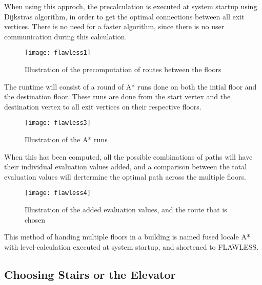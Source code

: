 When using this approch, the precalculation is executed at system startup using Dijkstras algorithm, in order to get the optimal connections between all exit vertices. There is no need for a faster algorithm, since there is no user communication during this calculation.

\begin{figure}[ht!]
    \centering
    \texttt{[image: flawless1]}
    \caption{Illustration of the precomputation of routes between the floors}
    \label{fig:precomp}
  \end{figure}

The runtime will consist of a round of A* runs done on both the intial floor and the destination floor. These runs are done from the start vertex and the destination vertex to all exit vertices on their respective floors. 

\begin{figure}[ht!]
    \centering
    \texttt{[image: flawless3]}
    \caption{Illustration of the A* runs}
    \label{fig:precomp}
  \end{figure}

When this has been computed, all the possible combinations of paths will have their individual evaluation values added, and a comparison between the total evaluation values will dertermine the optimal path across the multiple floors. 

\begin{figure}[ht!]
    \centering
    \texttt{[image: flawless4]}
    \caption{Illustration of the added evaluation values, and the route that is chosen}
    \label{fig:precomp}
  \end{figure}

This method of handing multiple floors in a building is named fused locale A* with level-calculation executed at system startup, and shortened to FLAWLESS.


\subsection{Choosing Stairs or the Elevator}


